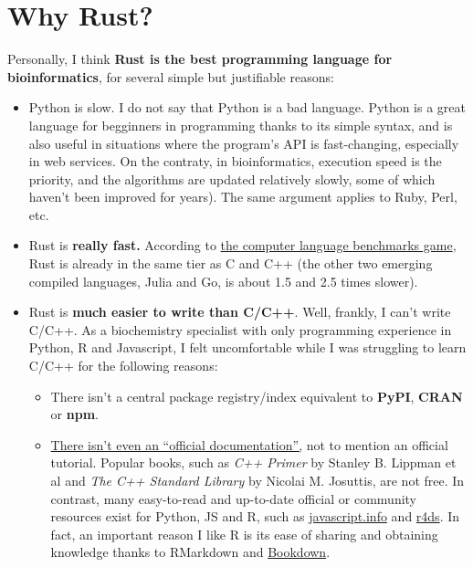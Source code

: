 \documentclass[
]{book}
\providecommand{\tightlist}{%
  \setlength{\itemsep}{0pt}\setlength{\parskip}{0pt}}
\begin{document}
\hypertarget{why-rust}{%
\section*{Why Rust?}\label{why-rust}}

Personally, I think \textbf{Rust is the best programming language for bioinformatics}, for several simple but justifiable reasons:

\begin{itemize}
\item
  Python is slow. I do not say that Python is a bad language. Python is a great language for begginners in programming thanks to its simple syntax, and is also useful in situations where the program's API is fast-changing, especially in web services. On the contraty, in bioinformatics, execution speed is the priority, and the algorithms are updated relatively slowly, some of which haven't been improved for years). The same argument applies to Ruby, Perl, etc.
\item
  Rust is \textbf{really fast.} According to \href{https://benchmarksgame-team.pages.debian.net/benchmarksgame/which-programs-are-fastest.html}{the computer language benchmarks game}, Rust is already in the same tier as C and C++ (the other two emerging compiled languages, Julia and Go, is about 1.5 and 2.5 times slower).
\item
  Rust is \textbf{much easier to write than C/C++}. Well, frankly, I can't write C/C++. As a biochemistry specialist with only programming experience in Python, R and Javascript, I felt uncomfortable while I was struggling to learn C/C++ for the following reasons:

  \begin{itemize}
  \tightlist
  \item
    There isn't a central package registry/index equivalent to \textbf{PyPI}, \textbf{CRAN} or \textbf{npm}.
  \item
    \href{https://stackoverflow.com/questions/34967756/where-is-the-official-c-documentation\#:~:text=C\%2B\%2B\%20is\%20not\%20a\%20product\%20and\%20there\%20is,etc.\%29.\%20–\%20sorush-r\%20Jan\%2023\%20\%2716\%20at\%2019\%3A28}{There isn't even an ``official documentation'',} not to mention an official tutorial. Popular books, such as \emph{C++ Primer} by Stanley B. Lippman et al and \emph{The C++ Standard Library} by Nicolai M. Josuttis, are not free. In contrast, many easy-to-read and up-to-date official or community resources exist for Python, JS and R, such as \href{https://javascript.info}{javascript.info} and \href{https://r4ds.had.co.nz}{r4ds}. In fact, an important reason I like R is its ease of sharing and obtaining knowledge thanks to RMarkdown and \href{https://bookdown.org}{Bookdown}.
  \end{itemize}


\end{itemize}
\end{document}
